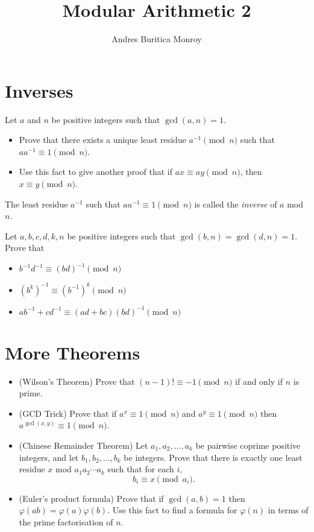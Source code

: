 \documentclass{article}
\title{Modular Arithmetic 2}
\author{Andres Buritica Monroy}
\date{}
\begin{document}
\maketitle
\section{Inverses}
Let $a$ and $n$ be positive integers such that $\gcd(a,n)=1$.
\begin{itemize}
	\item Prove that there exists a unique least residue $a^{-1}\pmod n$ such that
	      $aa^{-1}\equiv 1\pmod n$.
	\item Use this fact to give another proof that if $ax\equiv ay\pmod n$, then
	      $x\equiv y\pmod n$.
\end{itemize}
The least residue $a^{-1}$ such that $aa^{-1}\equiv 1\pmod n$ is called the \emph{inverse} of
$a$ mod $n$.

Let $a,b,c,d,k,n$ be positive integers such that
$\gcd(b,n)=\gcd(d,n)=1$. Prove that
\begin{itemize}
	\item $b^{-1}d^{-1}\equiv (bd)^{-1}\pmod n$
	\item $(b^k)^{-1}\equiv (b^{-1})^k\pmod n$
	\item $ab^{-1}+cd^{-1}\equiv (ad+bc)(bd)^{-1}\pmod n$
\end{itemize}
\section{More Theorems}
\begin{itemize}
	\item (Wilson's Theorem) Prove that $(n-1)!\equiv -1\pmod n$ if and only if $n$ is prime.
	\item (GCD Trick) Prove that if $a^x\equiv 1\pmod n$ and $a^y\equiv 1\pmod n$ then
	      $a^{\gcd(x,y)}\equiv 1\pmod n$.
	\item (Chinese Remainder Theorem) Let $a_1,a_2,\ldots,a_k$ be pairwise coprime positive integers, and let
	      $b_1,b_2,\ldots,b_k$ be integers. Prove that there is exactly one least
	      residue $x$ mod $a_1a_2\cdots a_k$ such that for each $i$,
	      \[b_i\equiv x\pmod {a_i}.\]
	\item (Euler's product formula) Prove that if $\gcd(a,b)=1$ then $\varphi(ab)=\varphi(a)\varphi(b)$. Use
	      this fact to find a formula for $\varphi(n)$ in terms of the prime
	      factorisation of $n$.
\end{itemize}
\end{document}
